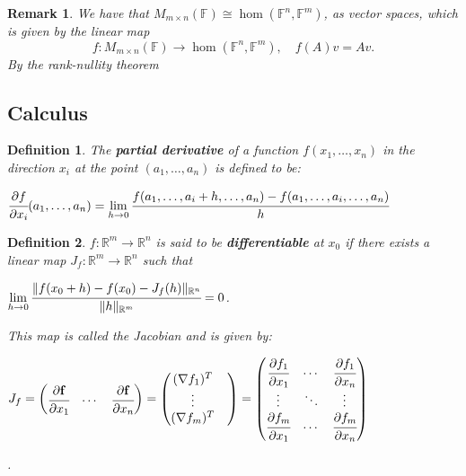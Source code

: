 \documentclass[12pt]{article}
\newcommand{\real}{\mathbb{R}}
\newcommand{\field}{\mathbb{F}}
\newcommand{\norm}[1]{\lVert #1 \rVert}
\newcommand{\im}[0]{\text{im}}
\newtheorem{defn}{Definition}[thm]
\newtheorem*{remark}{Remark}
\begin{document}
\begin{remark}
  We have that $M_{m \times n}(\field) \cong \hom(\field^n, \field^m)$, as vector spaces, which is given by the linear map
  \begin{equation*}
    f: M_{m \times n}(\field) \to \hom(\field^n, \field^m), \quad f(A)v = Av.
  \end{equation*}
  By the rank-nullity theorem
\end{remark}
\subsection{Calculus}

\begin{defn}
  The \textbf{partial derivative} of a function $f(x_1,\dots,x_n)$ in the direction $x_i$ at the point $(a_1, \dots, a_n)$ is defined to be:
  \begin{center}
    $\cfrac{\partial f}{\partial x_i}(a_1, \dots, a_n) = \lim\limits_{h \to 0} \cfrac{f(a_1,\dots, a_i + h, \dots, a_n) - f(a_1, \dots, a_i, \dots, a_n)}{h}$
  \end{center}
\end{defn}

\begin{defn}
  $f: \real^m \to \real^n$ is said to be \textbf{differentiable} at $x_0$ if there exists a linear map $J_f : \real^m \to \real^n$ such that
  \begin{center}
    $\lim\limits_{h \to 0} \cfrac{\norm{f(x_0 + h) - f(x_0) - J_f(h)}_{\real^n}}{\norm{h}_{\real^m}} = 0$.    
  \end{center}
  This map is called the Jacobian and is given by:
  \begin{center}
    $J_f =
    \begin{pmatrix}
      \cfrac{\partial \mathbf{f}}{\partial x_1} & \cdots & \cfrac{\partial \mathbf{f}}{\partial x_n}
    \end{pmatrix}
    =
    \begin{pmatrix}
      (\nabla f_1)^T \\
      \vdots &       \\
      (\nabla f_m)^T 
    \end{pmatrix}
    =
    \begin{pmatrix}
      \cfrac{\partial f_1}{\partial x_1} & \cdots & \cfrac{\partial f_1}{\partial x_n} \\
      \vdots & \ddots & \vdots \\ 
      \cfrac{\partial f_m}{\partial x_1} & \cdots & \cfrac{\partial f_m}{\partial x_n} \\
    \end{pmatrix}$
  \end{center}.
\end{defn}
\end{document}
